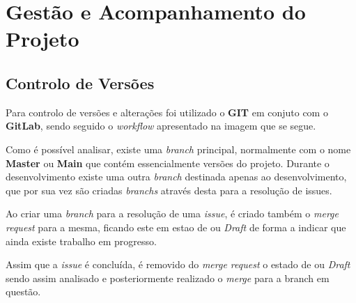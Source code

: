 \chapter{Gestão e Acompanhamento do Projeto}

\section{Controlo de Versões}

Para controlo de versões e alterações foi utilizado o \textbf{GIT} em conjuto com o \textbf{GitLab}, sendo seguido o \textit{workflow} apresentado na imagem que se segue.


Como é possível analisar, existe uma \textit{branch} principal, normalmente com o nome \textbf{Master} ou \textbf{Main} que contém essencialmente versões do projeto. Durante o desenvolvimento existe uma outra \textit{branch} destinada apenas ao desenvolvimento, que por sua vez são criadas \textit{branchs} através desta para a resolução de issues.

Ao criar uma \textit{branch} para a resolução de uma \textit{issue}, é criado também o \textit{merge request} para a mesma, ficando este em estao de \textit{} ou \textit{Draft} de forma a indicar que ainda existe trabalho em progresso.

Assim que a \textit{issue} é concluída, é removido do \textit{merge request} o estado de \textit{} ou \textit{Draft} sendo assim analisado e posteriormente realizado o \textit{merge} para a branch em questão.